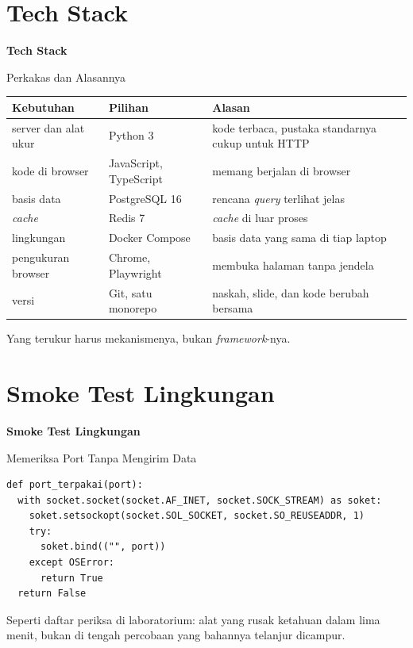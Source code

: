 \documentclass[aspectratio=169, table, 12pt]{beamer}
\begin{document}
\section{Tech Stack}

\begin{frame}{\hfill}
  \centering
  \Huge{\textbf{Tech Stack}}
\end{frame}

\begin{frame}{{\Large Perkakas dan Alasannya}}
  \vspace{4pt}
  \centering
  {\footnotesize
  \begin{tabularx}{\textwidth}{llY}
    \hline
    \textbf{Kebutuhan} & \textbf{Pilihan} & \textbf{Alasan} \\
    \hline
    server dan alat ukur & Python 3 & kode terbaca, pustaka standarnya cukup untuk HTTP \\
    \hline
    kode di browser & JavaScript, TypeScript & memang berjalan di browser \\
    \hline
    basis data & PostgreSQL 16 & rencana \textit{query} terlihat jelas \\
    \hline
    \textit{cache} & Redis 7 & \textit{cache} di luar proses \\
    \hline
    lingkungan & Docker Compose & basis data yang sama di tiap laptop \\
    \hline
    pengukuran browser & Chrome, Playwright & membuka halaman tanpa jendela \\
    \hline
    versi & Git, satu monorepo & naskah, slide, dan kode berubah bersama \\
    \hline
  \end{tabularx}}

  \vspace{4pt}
  {\small Yang terukur harus mekanismenya, bukan \textit{framework}-nya.}
\end{frame}

\section{Smoke Test Lingkungan}

\begin{frame}{\hfill}
  \centering
  \Huge{\textbf{Smoke Test Lingkungan}}
\end{frame}

\begin{frame}[fragile]{{\Large Memeriksa Port Tanpa Mengirim Data}}
  \vspace{2pt}
\begin{lstlisting}[style=PythonStyle]
def port_terpakai(port):
  with socket.socket(socket.AF_INET, socket.SOCK_STREAM) as soket:
    soket.setsockopt(socket.SOL_SOCKET, socket.SO_REUSEADDR, 1)
    try:
      soket.bind(("", port))
    except OSError:
      return True
  return False
\end{lstlisting}
  \vspace{2pt}
  {\small Seperti daftar periksa di laboratorium: alat yang rusak ketahuan
  dalam lima menit, bukan di tengah percobaan yang bahannya telanjur
  dicampur.}
\end{frame}
\end{document}
